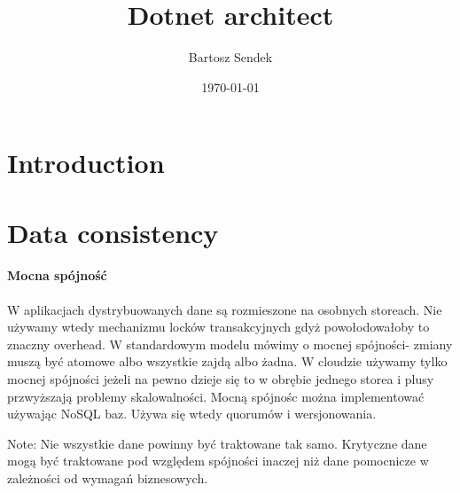 \documentclass{article}
\title{Dotnet architect}
\author{Bartosz Sendek}
\date{\today}
\begin{document}
\maketitle

\section{Introduction}
\section{Data consistency}
\paragraph{Mocna spójność}
W aplikacjach dystrybuowanych dane są rozmieszone na osobnych storeach. Nie używamy wtedy mechanizmu locków transakcyjnych gdyż 
powołodowałoby to znaczny overhead. W standardowym modelu mówimy o mocnej spójności- zmiany muszą być atomowe albo wszystkie zajdą albo żadna.
 W cloudzie używamy tylko mocnej spójności jeżeli na pewno dzieje się to w obrębie jednego storea i plusy przwyższają problemy skalowalności.
Mocną spójnośc można implementować używając NoSQL baz. Używa się wtedy quorumów i wersjonowania.

Note:
Nie wszystkie dane powinny być traktowane tak samo. Krytyczne dane mogą być traktowane pod względem spójności inaczej niż dane 
pomocnicze w zależności od wymagań biznesowych.
\end{document}
